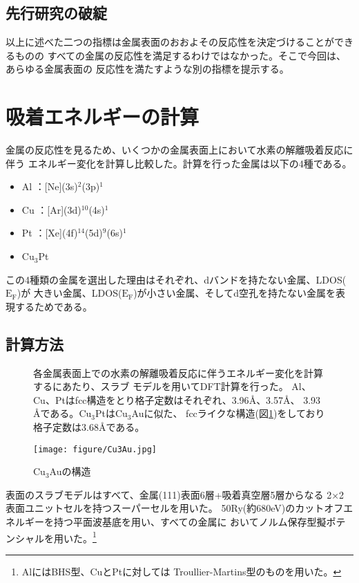 \documentclass[12pt]{ltjsarticle}
\begin{document}
\subsection{先行研究の破綻}
以上に述べた二つの指標は金属表面のおおよその反応性を決定づけることができるものの
すべての金属の反応性を満足するわけではなかった。そこで今回は、あらゆる金属表面の
反応性を満たすような別の指標を提示する。\cite{Science1995}

\section{吸着エネルギーの計算}
金属の反応性を見るため、いくつかの金属表面上において水素の解離吸着反応に伴う
エネルギー変化を計算し比較した。計算を行った金属は以下の4種である。
\begin{itemize}
 \item Al ：[Ne](3s)$^\text{2}$(3p)$^\text{1}$
 \item Cu ：[Ar](3d)$^\text{10}$(4s)$^\text{1}$
 \item Pt ：[Xe](4f)$^\text{14}$(5d)$^\text{9}$(6s)$^\text{1}$
 \item $\text{Cu}_\text{3}$Pt
\end{itemize}
この4種類の金属を選出した理由はそれぞれ、dバンドを持たない金属、LDOS($\text{E}_\text{F}$)が
大きい金属、LDOS($\text{E}_\text{F}$)が小さい金属、そしてd空孔を持たない金属を表現するためである。

\subsection{計算方法}
\begin{figure}[hbtp]
\begin{minipage}{.5\textwidth}
    各金属表面上での水素の解離吸着反応に伴うエネルギー変化を計算するにあたり、スラブ
    モデルを用いてDFT計算を行った。
    Al、Cu、Ptはfcc構造をとり格子定数はそれぞれ、3.96$\mbox{\AA}$、3.57$\mbox{\AA}$、
    3.93$\mbox{\AA}$である。$\text{Cu}_\text{3}$Ptは$\text{Cu}_\text{3}$Auに似た、
    fccライクな構造(図\ref{fig:Cu3Au})をしており格子定数は3.68$\mbox{\AA}$である。
\end{minipage}
\hfill
\begin{minipage}{.45\textwidth}
    \begin{center}
     \texttt{[image: figure/Cu3Au.jpg]}
    \end{center}
    \caption{Cu$_\text{3}$Auの構造}
    \label{fig:Cu3Au}
\end{minipage}
\end{figure}
表面のスラブモデルはすべて、金属(111)表面6層+吸着真空層5層からなる
2×2表面ユニットセルを持つスーパーセルを用いた。
50Ry(約680eV)のカットオフエネルギーを持つ平面波基底を用い、すべての金属に
おいてノルム保存型擬ポテンシャルを用いた。\footnote{AlにはBHS型、CuとPtに対しては
Troullier-Martins型のものを用いた。}
\end{document}
